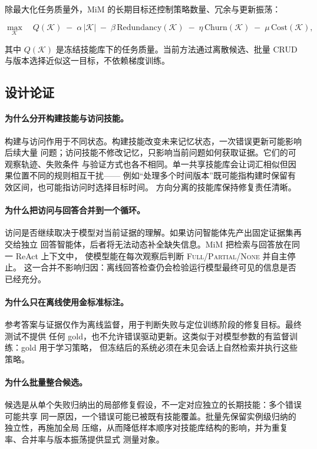 \documentclass[UTF8,11pt]{ctexart}
\newcommand{\KK}{\mathcal{K}}
\begin{document}
除最大化任务质量外，MiM 的长期目标还控制策略数量、冗余与更新振荡：

\begin{equation}
\label{eq:objective}
\max_{\KK} \quad Q(\KK) \;-\; \alpha\,|\KK| \;-\; \beta\,\mathrm{Redundancy}(\KK)
\;-\; \eta\,\mathrm{Churn}(\KK) \;-\; \mu\,\mathrm{Cost}(\KK),
\end{equation}

\noindent 其中 $Q(\KK)$ 是冻结技能库下的任务质量。当前方法通过离散候选、批量 CRUD
与版本选择近似这一目标，不依赖梯度训练。

\subsection{设计论证}
\label{sec:method-rationale}

\paragraph{为什么分开构建技能与访问技能。}
构建与访问作用于不同状态。构建技能改变未来记忆状态，一次错误更新可能影响后续大量
问题；访问技能不修改记忆，只影响当前问题如何获取证据。它们的可观察轨迹、失败条件
与验证方式也各不相同。单一共享技能库会让词汇相似但因果位置不同的规则相互干扰——
例如“处理多个时间版本”既可能指构建时保留有效区间，也可能指访问时选择目标时间。
方向分离的技能库保持修复责任清晰。

\paragraph{为什么把访问与回答合并到一个循环。}
访问是否继续取决于模型对当前证据的理解。如果访问智能体先产出固定证据集再交给独立
回答智能体，后者将无法动态补全缺失信息。MiM 把检索与回答放在同一 ReAct 上下文中，
使模型能在每次观察后判断 \textsc{Full}/\textsc{Partial}/\textsc{None} 并自主停止。
这一合并不影响归因：离线回答检查仍会检验运行模型最终可见的信息是否已经充分。

\paragraph{为什么只在离线使用金标准标注。}
参考答案与证据仅作为离线监督，用于判断失败与定位训练阶段的修复目标。最终测试不提供
任何 gold，也不允许错误驱动更新。这类似于对模型参数的有监督训练：gold 用于学习策略，
但冻结后的系统必须在未见会话上自然检索并执行这些策略。

\paragraph{为什么批量整合候选。}
候选是从单个失败归纳出的局部修复假设，不一定对应独立的长期技能：多个错误可能共享
同一原因，一个错误可能已被既有技能覆盖。批量先保留实例级归纳的独立性，再施加全局
压缩，从而降低样本顺序对技能库结构的影响，并为重复率、合并率与版本振荡提供显式
测量对象。
\end{document}
